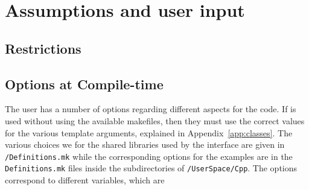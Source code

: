 \documentclass[11pt,a4paper]{article}
\begin{document}
\section{Assumptions and user input}\label{sec:assumptions}
\setcounter{equation}{0}
%
\subsection{Restrictions}\label{sec:restrictions}

\subsection{Options at Compile-time}\label{sec:options}
%
The user has a number of options regarding different aspects for the code. If \nsc is used without using the available makefiles, then they must use the correct values for the various template arguments, explained in Appendix~\ref{app:classes}.  The various choices we for the shared libraries used by the \PY interface are given in {\tt \nsc/Definitions.mk} while the corresponding options for the \CPP examples are in the {\tt Definitions.mk} files inside the subdirectories of {\tt \nsc/UserSpace/Cpp}. The options correspond to different variables, which are
%
\end{document}
